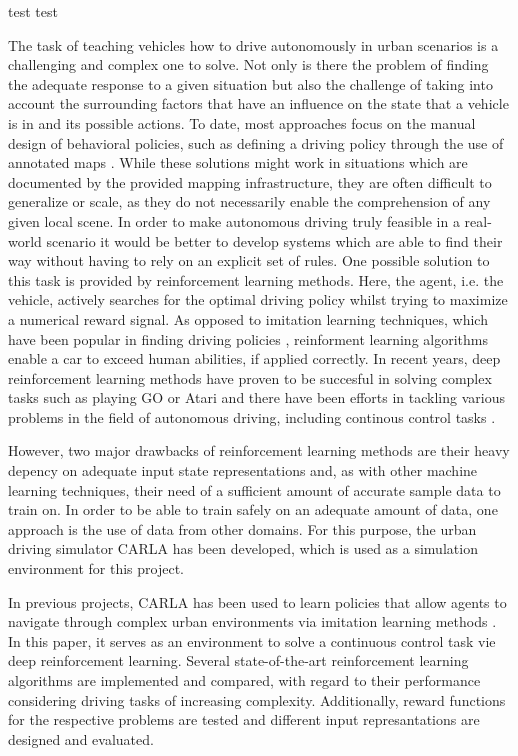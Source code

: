 \documentclass[letterpaper, 10 pt, conference]{ieeeconf}  %
\begin{document}

test \cite{janischLetMakeA3C} test

The task of teaching vehicles how to drive autonomously in urban scenarios is a challenging and complex one to solve. Not only is there the problem of finding the adequate response to a given situation but also the challenge of taking into account the surrounding factors that have an influence on the state that a vehicle is in and its possible actions. To date, most approaches focus on the manual design of behavioral policies, such as defining a driving policy through the use of annotated maps \cite{7339478}. While these solutions might work in situations which are documented by the provided mapping infrastructure, they are often difficult to generalize or scale, as they do not necessarily enable the comprehension of any given local scene. In order to make autonomous driving truly feasible in a real-world scenario it would be better to develop systems which are able to find their way without having to rely on an explicit set of rules. One possible solution to this task is provided by reinforcement learning methods. Here, the agent, i.e. the vehicle, actively searches for the optimal driving policy whilst trying to maximize a numerical reward signal. As opposed to imitation learning techniques, which have been popular in finding driving policies \cite{kendall2019learning}, reinforment learning algorithms enable a car to exceed human abilities, if applied correctly. In recent years, deep reinforcement learning methods have proven to be succesful in solving complex tasks such as playing GO \cite{44806} or Atari \cite{mnih2013playing} and there have been efforts in tackling various problems in the field of autonomous driving, including continous control tasks \cite{lillicrapContinuousControlDeep2015}.

However, two major drawbacks of reinforcement learning methods are their heavy depency on adequate input state representations \cite{DBLP:journals/corr/abs-1904-09503} and, as with other machine learning techniques, their need of a sufficient amount of accurate sample data to train on. In order to be able to train safely on an adequate amount of data, one approach is the use of data from other domains. For this purpose, the urban driving simulator CARLA has been developed, which is used as a simulation environment for this project.

In previous projects, CARLA has been used to learn policies that allow agents to navigate through complex urban environments via imitation learning methods \cite{DBLP:journals/corr/abs-1710-02410}\cite{DBLP:journals/corr/abs-1903-00640}. In this paper, it serves as an environment to solve a continuous control task vie deep reinforcement learning. Several state-of-the-art reinforcement learning algorithms are implemented and compared, with regard to their performance considering driving tasks of increasing complexity. Additionally, reward functions for the respective problems are tested and different input represantations are designed and evaluated.
\end{document}
